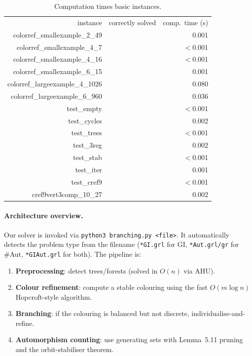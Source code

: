 \documentclass[twoside]{article}
\newcommand{\cmark}{\ding{51}}%
\begin{document}
\begin{table}[h]
\centering
\begin{tabular}{r|c|r}
instance & correctly solved & comp.\ time (s)\\
\noalign{\smallskip}\hline\hline\noalign{\smallskip}
colorref\_smallexample\_2\_49    & \cmark & 0.001\\
colorref\_smallexample\_4\_7     & \cmark & $<$0.001\\
colorref\_smallexample\_4\_16    & \cmark & $<$0.001\\
colorref\_smallexample\_6\_15    & \cmark & 0.001\\
colorref\_largeexample\_4\_1026  & \cmark & 0.080\\
colorref\_largeexample\_6\_960   & \cmark & 0.036\\
test\_empty                      & \cmark & $<$0.001\\
test\_cycles                     & \cmark & 0.002\\
test\_trees                      & \cmark & $<$0.001\\
test\_3reg                       & \cmark & 0.002\\
test\_stab                       & \cmark & $<$0.001\\
test\_iter                       & \cmark & 0.001\\
test\_cref9                      & \cmark & $<$0.001\\
cref9vert3comp\_10\_27           & \cmark & 0.002\\
\end{tabular}
\caption{Computation times basic instances.}\label{tab:basic}
\end{table}

\paragraph{Architecture overview.}
Our solver is invoked via \texttt{python3 branching.py <file>}. It automatically detects the problem type from the filename (\texttt{*GI.grl} for GI, \texttt{*Aut.grl/gr} for \#Aut, \texttt{*GIAut.grl} for both). The pipeline is:
\begin{enumerate}
\item \textbf{Preprocessing}: detect trees/forests (solved in $O(n)$ via AHU).
\item \textbf{Colour refinement}: compute a stable colouring using the fast $O(m \log n)$ Hopcroft-style algorithm.
\item \textbf{Branching}: if the colouring is balanced but not discrete, individualise-and-refine.
\item \textbf{Automorphism counting}: use generating sets with Lemma~5.11 pruning and the orbit-stabiliser theorem.
\end{enumerate}
\end{document}
